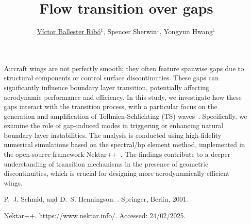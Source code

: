 \documentclass[a4paper,10pt]{article}
\begin{document}
%
%
\title{Flow transition over gaps}
%
\author{\underline{Víctor Ballester Ribó}$^1$, Spencer Sherwin$^1$, Yongyun Hwang$^1$}
\maketitle

%
%

Aircraft wings are not perfectly smooth; they often feature spanwise gaps due to structural components or control surface discontinuities. These gaps can significantly influence boundary layer transition, potentially affecting aerodynamic performance and efficiency. In this study, we investigate how these gaps interact with the transition process, with a particular focus on the generation and amplification of Tollmien-Schlichting (TS) waves~\cite{schmid_henningson_2001}. Specifically, we examine the role of gap-induced modes in triggering or enhancing natural boundary layer instabilities. The analysis is conducted using high-fidelity numerical simulations based on the spectral/hp element method, implemented in the open-source framework Nektar++~\cite{nektar}. The findings contribute to a deeper understanding of transition mechanisms in the presence of geometric discontinuities, which is crucial for designing more aerodynamically efficient wings.
\newline



\begin{thebibliography}{1}
P.~J. Schmid, and D.~S. Henningson.
.
\newblock Springer, Berlin, 2001.

Nektar++.
\newblock https://www.nektar.info/.
\newblock Accessed: 24/02/2025.
\end{thebibliography}
\end{document}

